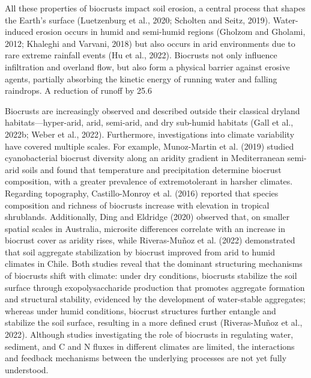 All these properties of biocrusts impact soil erosion, a central process that shapes the Earth’s surface (Luetzenburg et al., 2020; Scholten and Seitz, 2019). Water-induced erosion occurs in humid and semi-humid regions (Gholzom and Gholami, 2012; Khaleghi and Varvani, 2018) but also occurs in arid environments due to rare extreme rainfall events (Hu et al., 2022). Biocrusts not only influence infiltration and overland flow, but also form a physical barrier against erosive agents, partially absorbing the kinetic energy of running water and falling raindrops. A reduction of runoff by 25.6%

Biocrusts are increasingly observed and described outside their classical dryland habitats—hyper-arid, arid, semi-arid, and dry sub-humid habitats (Gall et al., 2022b; Weber et al., 2022). Furthermore, investigations into climate variability have covered multiple scales. For example, Munoz-Martin et al. (2019) studied cyanobacterial biocrust diversity along an aridity gradient in Mediterranean semi-arid soils and found that temperature and precipitation determine biocrust composition, with a greater prevalence of extremotolerant in harsher climates. Regarding topography, Castillo-Monroy et al. (2016) reported that species composition and richness of biocrusts increase with elevation in tropical shrublands. Additionally, Ding and Eldridge (2020) observed that, on smaller spatial scales in Australia, microsite differences correlate with an increase in biocrust cover as aridity rises, while Riveras-Muñoz et al. (2022) demonstrated that soil aggregate stabilization by biocrust improved from arid to humid climates in Chile. Both studies reveal that the dominant structuring mechanisms of biocrusts shift with climate: under dry conditions, biocrusts stabilize the soil surface through exopolysaccharide production that promotes aggregate formation and structural stability, evidenced by the development of water-stable aggregates; whereas under humid conditions, biocrust structures further entangle and stabilize the soil surface, resulting in a more defined crust (Riveras-Muñoz et al., 2022). Although studies investigating the role of biocrusts in regulating water, sediment, and C and N fluxes in different climates are limited, the interactions and feedback mechanisms between the underlying processes are not yet fully understood.

